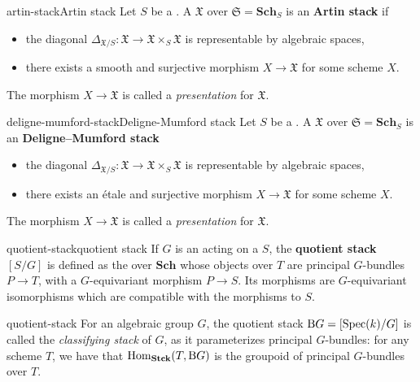 \begin{topic}{artin-stack}{Artin stack}
    Let $S$ be a . A  $\mathfrak{X}$ over $\mathfrak{S} = \textbf{Sch}_S$ is an \textbf{Artin stack} if
    \begin{itemize}
        \item the diagonal $\Delta_{\mathfrak{X}/S} \colon \mathfrak{X} \to \mathfrak{X} \times_S \mathfrak{X}$ is representable by algebraic spaces,
        \item there exists a smooth and surjective morphism $X \to \mathfrak{X}$ for some scheme $X$.
    \end{itemize}
    The morphism $X \to \mathfrak{X}$ is called a \textit{presentation} for $\mathfrak{X}$.
\end{topic}

\begin{topic}{deligne-mumford-stack}{Deligne-Mumford stack}
    Let $S$ be a . A  $\mathfrak{X}$ over $\mathfrak{S} = \textbf{Sch}_S$ is an \textbf{Deligne--Mumford stack}
    \begin{itemize}
        \item the diagonal $\Delta_{\mathfrak{X}/S} \colon \mathfrak{X} \to \mathfrak{X} \times_S \mathfrak{X}$ is representable by algebraic spaces,
        \item there exists an étale and surjective morphism $X \to \mathfrak{X}$ for some scheme $X$.
    \end{itemize}
    The morphism $X \to \mathfrak{X}$ is called a \textit{presentation} for $\mathfrak{X}$.
\end{topic}

\begin{topic}{quotient-stack}{quotient stack}
    If $G$ is an  acting on a  $S$, the \textbf{quotient stack} $[S/G]$ is defined as the  over $\textbf{Sch}$ whose objects over $T$ are principal $G$-bundles $P \to T$, with a $G$-equivariant morphism $P \to S$. Its morphisms are $G$-equivariant isomorphisms which are compatible with the morphisms to $S$.
\end{topic}

\begin{example}{quotient-stack}
    For an algebraic group $G$, the quotient stack $\textup{B}G = [\operatorname{Spec}(k) / G]$ is called the \textit{classifying stack} of $G$, as it parameterizes principal $G$-bundles: for any scheme $T$, we have that $\operatorname{Hom}_{\textbf{Stck}}(T, \textup{B}G)$ is the groupoid of principal $G$-bundles over $T$.
\end{example}

